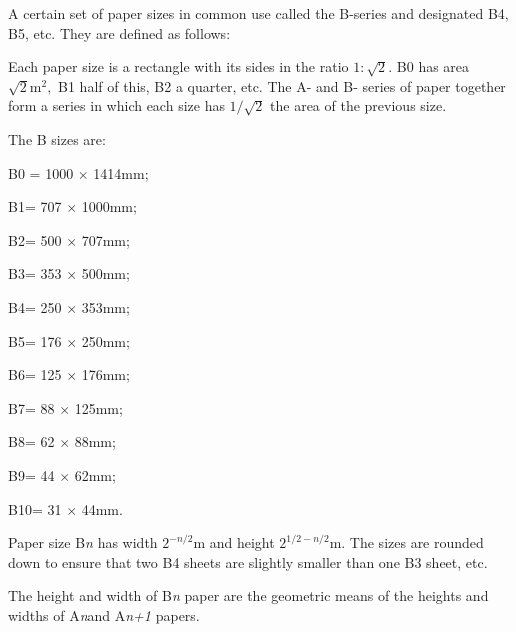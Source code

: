 A certain set of paper sizes in common use called the B-series and designated B4, B5, etc. They are defined as follows:
\par
Each paper size is a rectangle with its sides in the ratio
$ 1 : \sqrt{2}. $ B0 has area $ \sqrt{2} \mathrm{m}^2 , $ B1 half of this, 
B2 a quarter, etc. The A- and B- series of paper together form a series
in which each size has $ 1 / \sqrt{2} $ the area of the previous size.
\par
The B sizes are:
\par
B0 = 1000 \ensuremath{ \times } 1414mm;
\par
B1= 707 \ensuremath{ \times } 1000mm;
\par
B2= 500 \ensuremath{ \times } 707mm;
\par
B3= 353 \ensuremath{ \times } 500mm;
\par
B4= 250 \ensuremath{ \times } 353mm;
\par
B5= 176 \ensuremath{ \times } 250mm;
\par
B6= 125 \ensuremath{ \times } 176mm;
\par
B7= 88 \ensuremath{ \times } 125mm;
\par
B8= 62 \ensuremath{ \times } 88mm;
\par
B9= 44 \ensuremath{ \times } 62mm;
\par
B10= 31 \ensuremath{ \times } 44mm.
\par
Paper size B\emph{n} has width $2^{-n/2}$m and height $2^{1/2-n/2}$m.  The sizes are rounded down to ensure that two B4 sheets are slightly smaller than one B3 sheet, etc. 
\par
The height and width of B\emph{n} paper are the geometric means of the heights and widths of A\emph{n}and A\emph{n+1} papers.
  